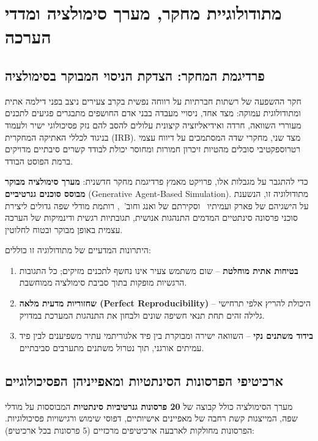 \chapter{מתודולוגיית מחקר, מערך סימולציה ומדדי הערכה}
\label{chap:methodology_simulation}

\section{פרדיגמת המחקר: הצדקת הניסוי המבוקר בסימולציה}
\label{sec:meth_paradigm_justification}
חקר ההשפעה של רשתות חברתיות על רווחה נפשית בקרב צעירים ניצב בפני דילמה אתית ומתודולוגית עמוקה: מצד אחד, ניסויי מעבדה בבני אדם החושפים מתבגרים פגיעים לתכנים מעוררי השוואה, חרדה ואידיאליזציה קיצונית עלולים להסב להם נזק פסיכולוגי ישיר ולעמוד בניגוד לכללי האתיקה המחקרית (\textenglish{IRB}). מצד שני, מחקרי שדה המסתמכים על דיווח עצמי רטרוספקטיבי סובלים מהטיות זיכרון חמורות ומחוסר יכולת לבודד קשרים סיבתיים מדויקים ברמת הפוסט הבודד.

כדי להתגבר על מגבלות אלו, פרויקט \projectname{} מאמץ פרדיגמת מחקר חדשנית: \textbf{מערך סימולציה מבוקר מבוסס סוכנים גנרטיביים} (\textenglish{Generative Agent-Based Simulation}). מתודולוגיה זו, הנשענת על הישגיהם של פארק ועמיתיו~\cite{park2023generative} וסקירתם של ואנג וחוב'~\cite{wang2024survey}, רותמת מודלי שפה גדולים ליצירת סוכני פרסונה סינתטיים המדמים התנהגות אנושית, תגובתיות רגשית ודינמיקות של הערכה עצמית באופן מבוקר ובטוח לחלוטין.

היתרונות המדעיים של מתודולוגיה זו כוללים:
\begin{enumerate}
    \item \textbf{בטיחות אתית מוחלטת} -- שום משתמש צעיר אינו נחשף לתכנים מזיקים; כל התגובות הרגשיות מופקות בתוך סביבת סימולציה ממוחשבת.
    \item \textbf{שחזוריות מדעית מלאה (\textenglish{Perfect Reproducibility})} -- היכולת להריץ אלפי תרחישי גלילה זהים תחת תנאי חשיפה שונים ולבחון את התנהגות המערכת במדויק.
    \item \textbf{בידוד משתנים נקי} -- השוואה ישירה ומבוקרת בין פיד אלגוריתמי עתיר משפיענים לבין פיד עמיתים אורגני, תוך נטרול משתנים מתערבים סביבתיים.
\end{enumerate}

\section{ארכיטיפי הפרסונות הסינתטיות ומאפייניהן הפסיכולוגיים}
\label{sec:meth_persona_archetypes}
מערך הסימולציה כולל קבוצה של \textbf{20 פרסונות גנרטיביות סינתטיות} המבוססות על מודלי שפה, המייצגות קשת רחבה של מאפיינים אישיותיים, דפוסי שימוש ורגישויות פסיכולוגיות. הפרסונות מחולקות לארבעה ארכיטיפים מרכזיים (5 פרסונות בכל ארכיטיפ):

